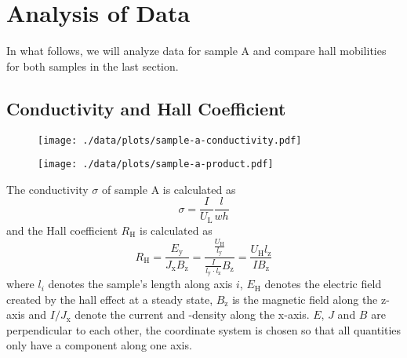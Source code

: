 \chapter{Analysis of Data}

In what follows, we will analyze data for sample A and compare hall mobilities for both samples in the last section.

\section{Conductivity and Hall Coefficient}
\begin{figure}
  \centering
  \texttt{[image: ./data/plots/sample-a-conductivity.pdf]}
  \label{fig:sample-a-conductivity}
\end{figure}

\begin{figure}
  \centering
  \texttt{[image: ./data/plots/sample-a-product.pdf]}
  \label{fig:sample-a-product}
\end{figure}

The conductivity $\sigma$ of sample A is calculated as
\begin{equation*}
	\sigma = \frac{I}{U_\text{L}} \frac{l}{w h}
\end{equation*}
and the Hall coefficient $R_\text{H}$ is calculated as
\begin{equation*}
	R_\text{H} = \frac{E_\text{y}}{J_\text{x} B_\text{z}} = \frac{\frac{U_\text{H}}{l_\text{y}}}{\frac{I}{l_\text{y} \cdot l_\text{z}} B_\text{z}} = \frac{U_\text{H} l_\text{z}}{I B_\text{z}}
\end{equation*}
where $l_i$ denotes the sample's length along axis $i$, $E_\text{H}$ denotes the electric field created by the hall effect at a steady state, $B_\text{z}$ is the magnetic field along the z-axis and $I / J_\text{x}$ denote the current and -density along the x-axis.
$E$, $J$ and $B$ are perpendicular to each other, the coordinate system is chosen so that all quantities only have a component along one axis.

